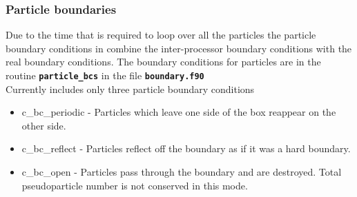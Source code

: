 \documentclass[12pt,a4paper]{article}
\newcommand{\inlinecode}[1]{{\color{warwickred} \bf\texttt{#1}}}
\newcommand{\EPOCH}{{\color{warwickdark}\fontfamily{phv}\selectfont{EPOCH}}}
\begin{document}
\subsubsection{Particle boundaries}
Due to the time that is required to loop over all the particles the particle
boundary conditions in {\EPOCH} combine the inter-processor boundary conditions
with the real boundary conditions. The boundary conditions for particles are in
the routine \inlinecode{particle\_bcs} in the file \inlinecode{boundary.f90} \\
Currently {\EPOCH} includes only three particle boundary conditions
\begin{itemize}
\item c\_bc\_periodic - Particles which leave one side of the box reappear on
  the other side.
\item c\_bc\_reflect - Particles reflect off the boundary as if it was a hard
  boundary.
\item c\_bc\_open - Particles pass through the boundary and are destroyed. Total
  pseudoparticle number is not conserved in this mode.
\end{itemize}
\end{document}
